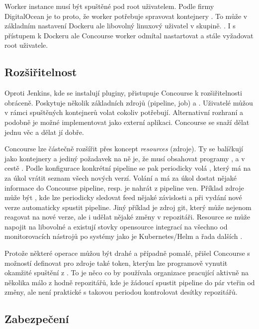         Worker instance musí být spuštěné pod root uživatelem. Podle firmy DigitalOcean je to proto, že worker potřebuje spravovat kontejnery . To může v základním nastavení Dockeru ale libovolný linuxový uživatel v  skupině. . I s přístupem k Dockeru ale Concourse worker odmítal nastartovat a stále vyžadovat root uživatele.

    \subsection{Rozšiřitelnost}
        Oproti Jenkins, kde se instalují pluginy, přistupuje Concourse k rozšiřitelnosti obráceně. Poskytuje několik základních zdrojů (pipeline, job) a . Uživatelé můžou v rámci spuštěných kontejnerů volat cokoliv potřebují. Alternativní rozhraní a podobně je možné implementovat jako externí aplikaci. Concourse se snaží dělat jednu věc a dělat jí dobře.

        Concourse lze částečně rozšířit přes koncept \textit{resources} (zdroje). Ty se balíčkují jako kontejnery a jediný požadavek na ně je, že musí obsahovat programy ,  a  v cestě  \cite{concourse-resource}. Podle konfigurace konkrétní pipeline se pak periodicky volá , který má na za úkol vrátit seznam všech nových verzí. Volání  a  má za úkol dostat nějaké informace do Concourse pipeline, resp. je nahrát z pipeline ven. Příklad zdroje může být , kde lze periodicky sledovat feed nějaké závislosti a při vydání nové verze automaticky spustit pipeline. Jiný příklad je zdroj git, který může nejenom reagovat na nové verze, ale i udělat nějaké změny v repozitáři. Resource se může napojit na libovolné  a existují stovky opensource integrací na všechno od monitorovacích nástrojů po \CD systémy jako je Kubernetes/Helm a řada dalších \cite{concourse-resource-list}.

        Protože některé  operace můžou být drahé a případně pomalé, přišel Concourse s možností definovat pro zdroje také token, kterým lze programově vynutit okamžité spuštění  z . To je něco co by používala organizace pracující aktivně na několika málo z hodně repozitářů, kde je žádoucí spustit pipeline do pár vteřin od změny, ale není praktické s takovou periodou kontrolovat desítky repozitářů.

    \subsection{Zabezpečení}
        \label{subsec:concourse-security}

